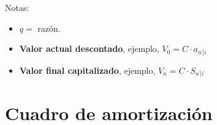 \documentclass[10pt, a4paper]{article}
\begin{document}
	\vspace*{0.5cm}
	
	Notas:
	\begin{itemize}[leftmargin=*]
		\item[] $q =$ razón.
		\item[] \textbf{Valor actual descontado}, ejemplo, $V_{0} = C \cdot a_{n \rceil i}$
		\item[] \textbf{Valor final capitalizado}, ejemplo, $V_{n} = C \cdot S_{n \rceil i}$
	\end{itemize}
	
	\newpage
	
	\section*{Cuadro de amortización}
	
\end{document}

